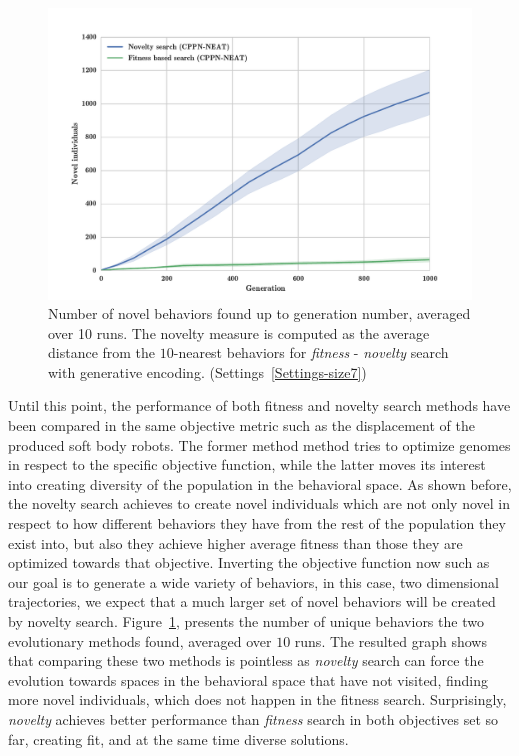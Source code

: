\begin{figure}[t!]
\centering
\includegraphics[width=1.0\textwidth]{../Figures/Results/novelIndividualsFitNovComp.pdf}
\caption{Number of novel behaviors found up to generation number, averaged over 10 runs. The novelty measure is computed as the average distance from the $10$-nearest behaviors for \emph{fitness} - \emph{novelty} search with generative encoding. (Settings~\ref{Settings-size7})}
\label{fig:novelIndividualsFitNovComp}
\end{figure}

Until this point, the performance of both fitness and novelty search methods have been compared in the same objective metric such as the displacement of the produced soft body robots. The former method method tries to optimize genomes in respect to the specific objective function, while the latter moves its interest into creating diversity of the population in the behavioral space. As shown before, the novelty search achieves to create novel individuals which are not only novel in respect to how different behaviors they have from the rest of the population they exist into, but also they achieve higher average fitness than those they are optimized towards that objective. Inverting the objective function now such as our goal is to generate a wide variety of behaviors, in this case, two dimensional trajectories, we expect that a much larger set of novel behaviors will be created by novelty search. Figure~\ref{fig:novelIndividualsFitNovComp}, presents the number of unique behaviors the two evolutionary methods found, averaged over $10$ runs. The resulted graph shows that comparing these two methods is pointless as \emph{novelty} search can force the evolution towards spaces in the behavioral space that have not visited, finding more novel individuals, which does not happen in the fitness search. Surprisingly, \emph{novelty} achieves better performance than \emph{fitness} search in both objectives set so far, creating fit, and at the same time diverse solutions.

